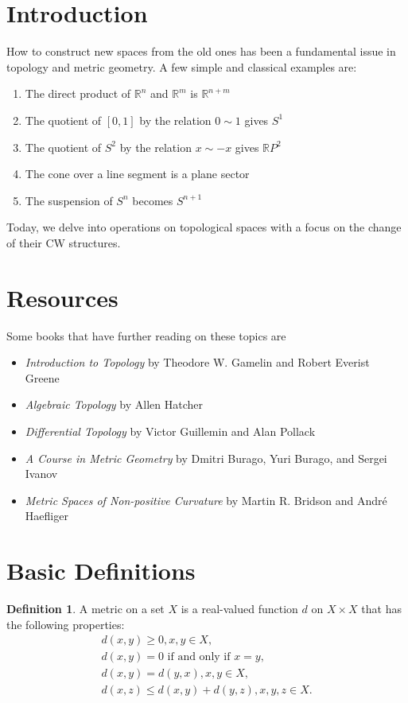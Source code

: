 \documentclass{article}
\theoremstyle{definition}
\newtheorem{definition}{Definition}[section]
\theoremstyle{remark}
\begin{document}
\section{Introduction}
How to construct new spaces from the old ones has been a fundamental issue in topology and metric geometry. A few simple and classical examples are: 
\begin{enumerate}
\item The direct product of $\mathbb{R}^{n}$ and $\mathbb{R}^{m}$ is $\mathbb{R}^{n + m}$
\item The quotient of $[0, 1]$ by the relation $0 \sim 1$ gives $S^{1}$
\item The quotient of $S^{2}$ by the relation $x \sim -x$ gives $\mathbb{R}P^{2}$
\item The cone over a line segment is a plane sector
\item The suspension of $S^{n}$ becomes $S^{n + 1}$ 
\end{enumerate}
Today, we delve into operations on topological spaces with a focus on the change of their CW structures.  

\section{Resources}
Some books that have further reading on these topics are
\begin{itemize}
    \item \emph{Introduction to Topology} by Theodore W. Gamelin and Robert Everist Greene 
    \item \emph{Algebraic Topology} by Allen Hatcher 
    \item \emph{Differential Topology} by Victor Guillemin and Alan Pollack 
    \item \emph{A Course in Metric Geometry} by Dmitri Burago, Yuri Burago, and Sergei Ivanov 
    \item \emph{Metric Spaces of Non-positive Curvature} by Martin R. Bridson and Andr\'{e} Haefliger 
\end{itemize}

\section{Basic Definitions} 
\begin{definition}
A metric on a set $X$ is a real-valued function $d$ on $X \times X$ that has the following properties: 
\begin{eqnarray}
d(x, y) \geq 0, x, y \in X,\\
d(x, y) = 0 \text{ if and only if $x = y$,}\\
d(x, y) = d(y, x), x, y \in X, \\
d(x, z) \leq d(x, y) + d(y, z), x, y, z \in X. 
\end{eqnarray}
\end{definition}
\end{document}
